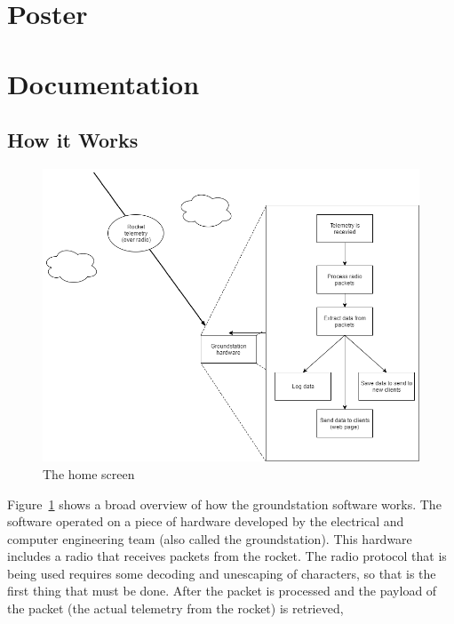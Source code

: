 \documentclass[10pt,draftclsnofoot,onecolumn]{IEEEtran}
\begin{document}
\newpage
\section{Poster}


















\newpage
\section{Documentation}
\subsection{How it Works}
	\begin{figure}[thbp!]
		\centering\includegraphics[width=170mm]{howitworks}
		\caption{The home screen}
		\label{howitworks}
	\end{figure}
Figure~\ref{howitworks} shows a broad overview of how the groundstation software works.
The software operated on a piece of hardware developed by the electrical and computer engineering team (also called the groundstation).
This hardware includes a radio that receives packets from the rocket.
The radio protocol that is being used requires some decoding and unescaping of characters, so that is the
first thing that must be done.
After the packet is processed and the payload of the packet (the actual telemetry from the rocket) is retrieved,
\end{document}
